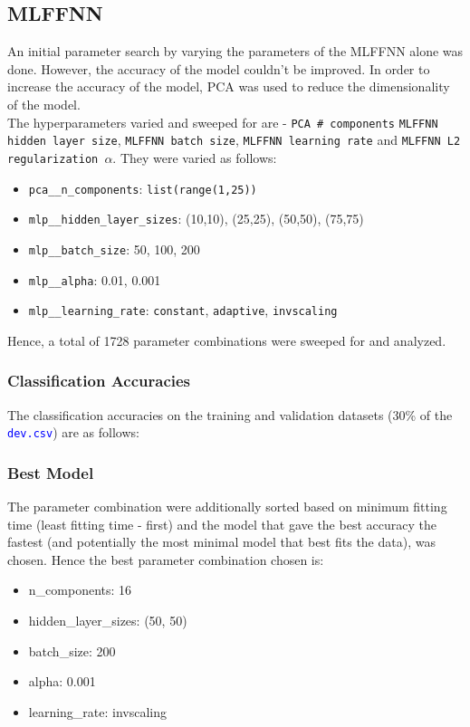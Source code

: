 \documentclass[11pt,a4paper]{article}
\newcommand{\noi}{\noindent}
\def\tt#1{\texttt{#1}}
\def\colortt#1{\textcolor{blue}{\texttt{#1}}}
\begin{document}
\subsection{MLFFNN}
An initial parameter search by varying the parameters of the MLFFNN alone was done. However, the accuracy of the model couldn't be improved. In order to increase the accuracy of the model, PCA was used to reduce the dimensionality of the model.\\

\noi
The hyperparameters varied and sweeped for are - \tt{PCA \# components} \tt{MLFFNN hidden layer size}, \tt{MLFFNN batch size}, \tt{MLFFNN learning rate} and \tt{MLFFNN L2 regularization $\alpha$}. They were varied as follows:
\begin{itemize}
    \itemsep0em
    \item \tt{pca\_\_n\_components}: \tt{list(range(1,25))}
    \item \tt{mlp\_\_hidden\_layer\_sizes}: (10,10), (25,25), (50,50), (75,75)
    \item \tt{mlp\_\_batch\_size}: 50, 100, 200
    \item \tt{mlp\_\_alpha}: 0.01, 0.001
    \item \tt{mlp\_\_learning\_rate}: \tt{constant}, \tt{adaptive}, \tt{invscaling}
\end{itemize}

\noi
Hence, a total of 1728 parameter combinations were sweeped for and analyzed.


\subsubsection{Classification Accuracies}
The classification accuracies on the training and validation datasets (30\% of the \colortt{dev.csv}) are as follows:


\subsubsection{Best Model}
The parameter combination were additionally sorted based on minimum fitting time (least fitting time - first) and the model that gave the best accuracy the fastest (and potentially the most minimal model that best fits the data), was chosen. Hence the best parameter combination chosen is:
\begin{itemize}
    \itemsep0em
    \item n\_components: 16
    \item hidden\_layer\_sizes: (50, 50)
    \item batch\_size: 200
    \item alpha: 0.001
    \item learning\_rate: invscaling
\end{itemize}
\end{document}
